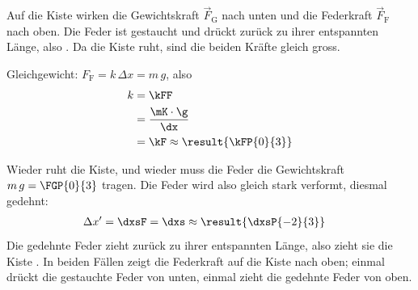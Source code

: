 \begin{abcliste}
\abc
Auf die Kiste wirken die Gewichtskraft $\vec F_\mathrm{G}$ nach unten und die Federkraft $\vec F_\mathrm{F}$ nach oben. Die Feder ist gestaucht und drückt zurück zu ihrer entspannten Länge, also . Da die Kiste ruht, sind die beiden Kräfte gleich gross.
\begin{center}
\end{center}

\abc
Gleichgewicht: $F_\mathrm{F} = k\,\Delta x = m\,g$, also
\begin{align}
 k &= \kFF \\
   &= \frac{\mK\cdot\g}{\dx} \\
   &= \kF \approx \result{\kFP{0}{3}}
\end{align}

\abc
Wieder ruht die Kiste, und wieder muss die Feder die Gewichtskraft $m\,g = \FGP{0}{3}$ tragen. Die Feder wird also gleich stark verformt, diesmal gedehnt:
\begin{align}
 \Delta x' &= \dxsF = \dxs \approx \result{\dxsP{-2}{3}}
\end{align}
Die gedehnte Feder zieht zurück zu ihrer entspannten Länge, also zieht sie die Kiste . In beiden Fällen zeigt die Federkraft auf die Kiste nach oben; einmal drückt die gestauchte Feder von unten, einmal zieht die gedehnte Feder von oben.
\end{abcliste}
